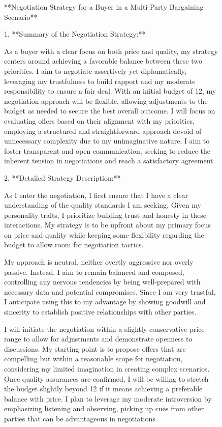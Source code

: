 \begin{figure}[htbp]
\centering
\begin{tcolorbox}[colback=blue!2!white, colframe=gray!50!blue]
\begin{minipage}{\linewidth}
\small
**Negotiation Strategy for a Buyer in a Multi-Party Bargaining Scenario**

1. **Summary of the Negotiation Strategy:**

As a buyer with a clear focus on both price and quality, my strategy centers around achieving a favorable balance between these two priorities. I aim to negotiate assertively yet diplomatically, leveraging my trustfulness to build rapport and my moderate responsibility to ensure a fair deal. With an initial budget of 12, my negotiation approach will be flexible, allowing adjustments to the budget as needed to secure the best overall outcome. I will focus on evaluating offers based on their alignment with my priorities, employing a structured and straightforward approach devoid of unnecessary complexity due to my unimaginative nature. I aim to foster transparent and open communication, seeking to reduce the inherent tension in negotiations and reach a satisfactory agreement.

2. **Detailed Strategy Description:**

As I enter the negotiation, I first ensure that I have a clear understanding of the quality standards I am seeking. Given my personality traits, I prioritize building trust and honesty in these interactions. My strategy is to be upfront about my primary focus on price and quality while keeping some flexibility regarding the budget to allow room for negotiation tactics.

My approach is neutral, neither overtly aggressive nor overly passive. Instead, I aim to remain balanced and composed, controlling any nervous tendencies by being well-prepared with necessary data and potential compromises. Since I am very trustful, I anticipate using this to my advantage by showing goodwill and sincerity to establish positive relationships with other parties. 

I will initiate the negotiation within a slightly conservative price range to allow for adjustments and demonstrate openness to discussions. My starting point is to propose offers that are compelling but within a reasonable scope for negotiation, considering my limited imagination in creating complex scenarios. Once quality assurances are confirmed, I will be willing to stretch the budget slightly beyond 12 if it means achieving a preferable balance with price. I plan to leverage my moderate introversion by emphasizing listening and observing, picking up cues from other parties that can be advantageous in negotiations.


\end{minipage}
\end{tcolorbox}
\end{figure}

